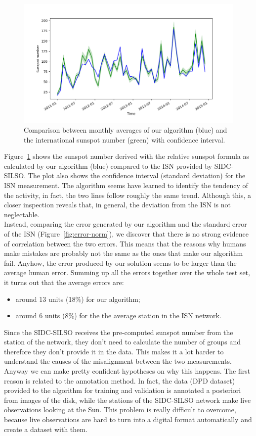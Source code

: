\begin{figure}[b!]
  \centering
  \captionsetup{justification=centering}
  \includegraphics[width=\textwidth]{./pictures/result-monthly-3}
  \caption{Comparison between monthly averages of our algorithm (blue) and the international sunspot number (green) with confidence interval.}
  \label{fig:result-monthly-3}
\end{figure}
Figure~\ref{fig:result-monthly-3} shows the sunspot number derived with the relative sunspot formula as calculated by our algorithm (blue) compared to the ISN provided by SIDC-SILSO. The plot also shows the confidence interval (standard deviation) for the ISN measurement. The algorithm seems have learned to identify the tendency of the activity, in fact, the two lines follow roughly the same trend. Although this, a closer inspection reveals that, in general, the deviation from the ISN is not neglectable.\\
Instead, comparing the error generated by our algorithm and the standard error of the ISN (Figure~\ref{fig:error-norm}), we discover that there is no strong evidence of correlation between the two errors. This means that the reasons why humans make mistakes are probably not the same as the ones that make our algorithm fail. Anyhow, the error produced by our solution seems to be larger than the average human error. Summing up all the errors together over the whole test set, it turns out that the average errors are:
\begin{itemize}
  \item around 13 units (18\%) for our algorithm;
  \item around 6 units (8\%) for the the average station in the ISN network.
\end{itemize}
Since the SIDC-SILSO receives the pre-computed sunspot number from the station of the network, they don't need to calculate the number of groups and therefore they don't provide it in the data. This makes it a lot harder to understand the causes of the misalignment between the two measurements. Anyway we can make pretty confident hypotheses on why this happens. The first reason is related to the annotation method. In fact, the data (DPD dataset) provided to the algorithm for training and validation is annotated a posteriori from images of the disk, while the stations of the SIDC-SILSO network make live observations looking at the Sun. This problem is really difficult to overcome, because live observations are hard to turn into a digital format automatically and create a dataset with them.
